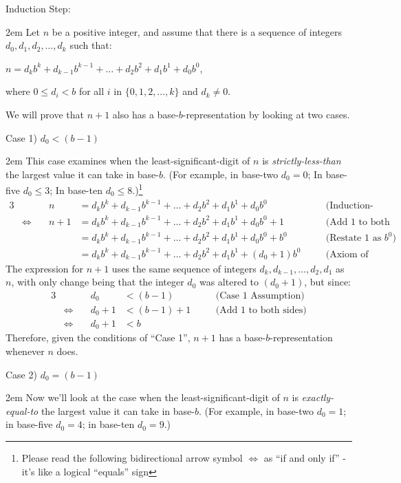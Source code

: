 \documentclass{article}
\newenvironment{jprIn}{\begin{adjustwidth}{2em}{}}{\end{adjustwidth}}
\begin{document}
\bigskip
Induction Step:
\begin{jprIn}
Let $n$ be a positive integer, and assume that
there is a sequence
of integers $d_0, d_1, d_2,\dots{},d_k$ such that:

\hspace{3em}$n=d_kb^k+d_{k-1}b^{k-1}+\dots+d_2b^2+d_1b^1+d_0b^0$,

where $0\le{}d_i<b$ for all $i$ in $\{0,1,2,\dots{},k\}$ and $d_k\ne0$.

We will prove that $n+1$ also has a
base-$b$-representation by looking at two cases.

Case 1) $d_0<(b-1)$
\begin{jprIn}
This case examines when the least-significant-digit
of $n$ is \emph{strictly-less-than} the largest value it can take in base-$b$.
(For example, in base-two $d_0 = 0$;
In base-five $d_0\le{}3$;
In base-ten $d_0\le{}8$.)\footnote{Please read the following
bidirectional arrow symbol $\Leftrightarrow$
as ``if and only if'' - it's like a logical ``equals'' sign}
{\small
\begin{alignat*}{3}
  &&n
  &= d_kb^k+d_{k-1}b^{k-1}+\dots+d_2b^2+d_1b^1+d_0b^0 &&\quad\text{(Induction-Assumption)}\\
  &\Leftrightarrow\quad
  &n+1
  &= d_kb^k+d_{k-1}b^{k-1}+\dots+d_2b^2+d_1b^1+d_0b^0 + 1 &&\quad\text{(Add 1 to both sides)}\\  
  &&&= d_kb^k+d_{k-1}b^{k-1}+\dots+d_2b^2+d_1b^1+d_0b^0 + b^0 &&\quad\text{(Restate 1 as }b^0\text{)}\\
  &&&= d_kb^k+d_{k-1}b^{k-1}+\dots+d_2b^2+d_1b^1 + (d_0+1)b^0 &&\quad\text{(Axiom of Distribution)}
\end{alignat*}
}The expression for $n+1$ uses the same sequence of
integers $d_k, d_{k-1},\dots{},d_2,d_1$ as $n$, with only
change being that the integer $d_0$ was altered to $(d_0{+}1)$, but since:
\begin{alignat*}{3}
  &&d_0
  &< (b-1) &&\quad\text{(Case 1 Assumption)}\\
  &\Leftrightarrow\quad
  &d_0+1
  &< (b-1)+1 &&\quad\text{(Add 1 to both sides)}\\  
  &\Leftrightarrow\quad
  &d_0+1
  &< b
\end{alignat*}
Therefore, given the conditions of ``Case 1'', $n+1$ has a base-$b$-representation whenever $n$ does.
\end{jprIn}

\bigskip
Case 2) $d_0=(b-1)$
\begin{jprIn}
Now we'll look at the case when the least-significant-digit of $n$ is \emph{exactly-equal-to}
the largest value it can take in base-$b$.
(For example, in base-two
$d_0=1$; in base-five
$d_0=4$; in base-ten $d_0=9$.)


\end{jprIn}
\end{jprIn}
\end{document}

